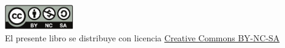 
\thispagestyle{empty}


\vspace*{3cm}

\begin{center}
 \includegraphics[width=3cm]{img/by-nc-sa.pdf}\\ \bigskip
 El presente libro se distribuye con licencia \href{http://creativecommons.org/licenses/by-nc-sa/3.0/}{Creative Commons BY-NC-SA}
\end{center}